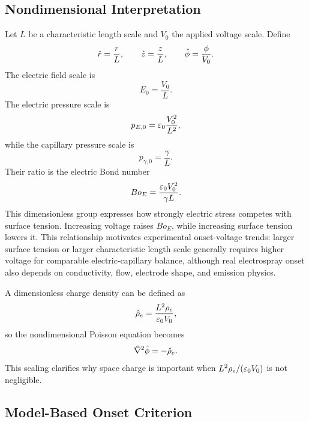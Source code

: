 \subsection{Nondimensional Interpretation}

Let $L$ be a characteristic length scale and $V_0$ the applied voltage scale. Define
\begin{equation}
    \hat r=\frac{r}{L},\qquad
    \hat z=\frac{z}{L},\qquad
    \hat{\phi}=\frac{\phi}{V_0}.
\end{equation}
The electric field scale is
\begin{equation}
    E_0=\frac{V_0}{L}.
\end{equation}
The electric pressure scale is
\begin{equation}
    p_{E,0}=\varepsilon_0\frac{V_0^2}{L^2},
\end{equation}
while the capillary pressure scale is
\begin{equation}
    p_{\gamma,0}=\frac{\gamma}{L}.
\end{equation}
Their ratio is the electric Bond number
\begin{equation}
    Bo_E=\frac{\varepsilon_0 V_0^2}{\gamma L}.
\end{equation}
This dimensionless group expresses how strongly electric stress competes with surface tension. Increasing voltage raises $Bo_E$, while increasing surface tension lowers it. This relationship motivates experimental onset-voltage trends: larger surface tension or larger characteristic length scale generally requires higher voltage for comparable electric-capillary balance, although real electrospray onset also depends on conductivity, flow, electrode shape, and emission physics.

A dimensionless charge density can be defined as
\begin{equation}
    \hat\rho_e=\frac{L^2\rho_e}{\varepsilon_0 V_0},
\end{equation}
so the nondimensional Poisson equation becomes
\begin{equation}
    \hat\nabla^2\hat{\phi}=-\hat\rho_e.
\end{equation}
This scaling clarifies why space charge is important when $L^2\rho_e/(\varepsilon_0 V_0)$ is not negligible.

\subsection{Model-Based Onset Criterion}


